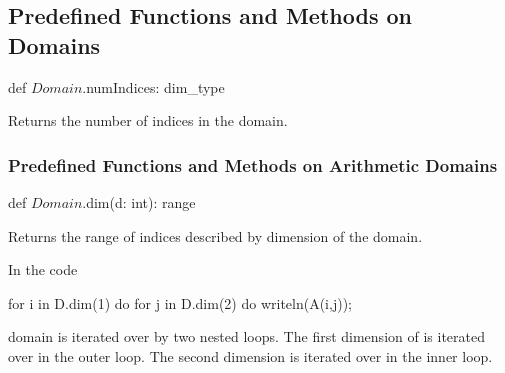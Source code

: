 \subsection{Predefined Functions and Methods on Domains}

\begin{protohead}
def $Domain$.numIndices: dim_type
\end{protohead}
\begin{protobody}
Returns the number of indices in the domain.
\end{protobody}



\subsubsection{Predefined Functions and Methods on Arithmetic Domains}

\begin{protohead}
def $Domain$.dim(d: int): range
\end{protohead}
\begin{protobody}
Returns the range of indices described by dimension  of the
domain.
\end{protobody}

\begin{example}
In the code
\begin{chapel}
for i in D.dim(1) do
  for j in D.dim(2) do
    writeln(A(i,j));
\end{chapel}
domain  is iterated over by two nested loops.  The first
dimension of  is iterated over in the outer loop.  The second
dimension is iterated over in the inner loop.
\end{example}

